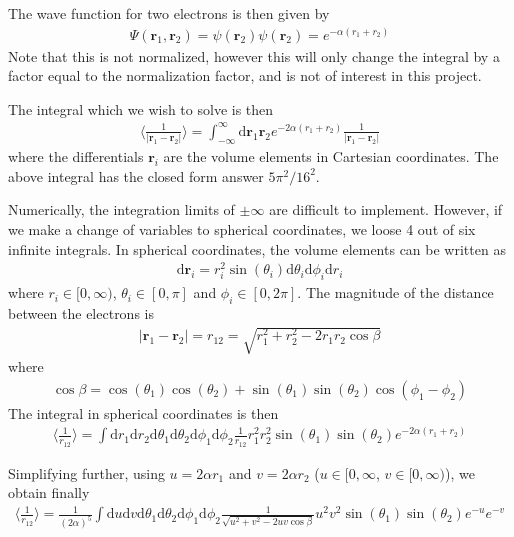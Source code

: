 \documentclass[twoside, 11pt]{article}
\renewcommand{\d}{\mathrm{d}}
\begin{document}
		The wave function for two electrons is then given by
		\begin{align}
			\Psi(\mathbf{r}_1, \mathbf{r}_2) = \psi(\mathbf{r}_2)\psi(\mathbf{r}_2) = e^{-\alpha(r_1 + r_2)}
		\end{align}
		Note that this is not normalized, however this will only change the integral by a factor equal to the normalization factor, and is not of interest in this project.
		
		The integral which we wish to solve is then
		\begin{align}
			\langle \frac{1}{|\mathbf{r}_1 - \mathbf{r}_2|} \rangle = \int_{-\infty}^{\infty} \d\mathbf{r}_1 \mathbf{r}_2 e^{-2\alpha(r_1+r_2)} \frac{1}{|\mathbf{r}_1 - \mathbf{r}_2|} \label{eq: unchanged integral}
		\end{align}
		where the differentials $\mathbf{r}_i$ are the volume elements in Cartesian coordinates. The above integral has the closed form answer $5\pi^2/16^2$.
		
		Numerically, the integration limits of $\pm \infty$ are difficult to implement. However, if we make a change of variables to spherical coordinates, we loose 4 out of six infinite integrals.
		In spherical coordinates, the volume elements can be written as
		\begin{align}
			\d\mathbf{r}_i = r_i^2\sin (\theta_i)\d \theta_i \d \phi_i \d r_i
		\end{align}
		where $r_i \in [0, \infty)$, $\theta_i \in [0, \pi]$ and $\phi_i \in [0, 2\pi]$. The magnitude of the distance between the electrons is 
		\begin{align}
			|\mathbf{r}_1 - \mathbf{r}_2| = r_{12} = \sqrt{r_1^2 + r_2^2 - 2r_1 r_2 \cos \beta}
		\end{align}
		where
		\begin{align}
			\cos\beta = \cos(\theta_1) \cos (\theta_2) + \sin(\theta_1)\sin(\theta_2) \cos(\phi_1 - \phi_2) \nonumber
		\end{align}
		The integral in spherical coordinates is then
		\begin{align}
			\langle \frac{1}{r_{12}} \rangle = \int \d r_1 \d r_2 \d \theta_1 \d \theta_2 \d \phi_1 \d \phi_2 \frac{1}{r_{12}} r_1^2r_2^2\sin(\theta_1)\sin(\theta_2) e^{-2\alpha(r_1+r_2)}
		\end{align}
		
		Simplifying further, using $u = 2\alpha r_1$ and $v = 2\alpha r_2$ ($u\in [0,\infty$, $v\in [0, \infty)$), we obtain finally
		\begin{align}
			\langle \frac{1}{r_{12}} \rangle = \frac{1}{(2\alpha)^5} \int \d u \d v \d \theta_1 \d \theta_2 \d \phi_1 \d \phi_2 \frac{1}{\sqrt{u^2 + v^2 - 2uv\cos\beta}} u^2v^2\sin(\theta_1)\sin(\theta_2) e^{-u}e^{-v} \label{eq: integral in spherical coordinates, u, v}
		\end{align}
		
\end{document}
